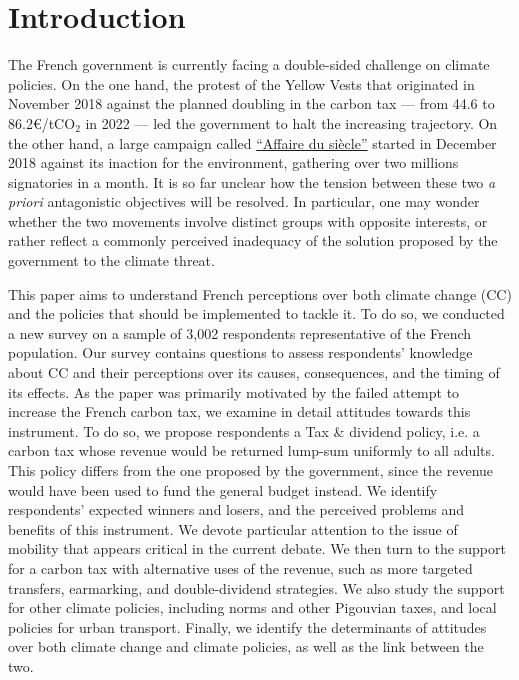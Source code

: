 \documentclass[english,5p,authoryear]{elsarticle}
\begin{document}




\setcounter{tocdepth}{2}

\vfill\eject 
\linenumbers

\section{Introduction}

The French government is currently facing a double-sided challenge on climate policies. On the one hand, the protest of the Yellow Vests that originated in November 2018 against the planned doubling in the carbon tax  --- from 44.6 to 86.2\euro{}/tCO$_2$ in 2022 --- led the government to halt the increasing trajectory. On the other hand, a large campaign called \href{https://laffairedusiecle.net/}{``Affaire du siècle''} started in December 2018 against its inaction for the environment, gathering over two millions signatories in a month. It is so far unclear how the tension between these two \textit{a priori} antagonistic objectives will be resolved. In particular, one may wonder whether the two movements involve distinct groups with opposite interests, or rather reflect a commonly perceived inadequacy of the solution proposed by the government to the climate threat.

This paper aims to understand French perceptions over both climate change (CC) and the policies that should be implemented to tackle it. To do so, we conducted a new survey on a sample of 3,002 respondents representative of the French population. Our survey contains questions to assess respondents' knowledge about CC and their perceptions over its causes, consequences, and the timing of its effects. As the paper was primarily motivated by the failed attempt to increase the French carbon tax, we examine in detail attitudes towards this instrument. To do so, we propose respondents a Tax \& dividend policy, i.e. a carbon tax whose revenue would be returned lump-sum uniformly to all adults. This policy differs from the one proposed by the government, since the revenue would have been used to fund the general budget instead. We identify respondents' expected winners and losers, and the perceived problems and benefits of this instrument. We devote particular attention to the issue of mobility that appears critical in the current debate. We then turn to the support for a carbon tax with alternative uses of the revenue, such as more targeted transfers, earmarking, and double-dividend strategies. We also study the support for other climate policies, including norms and other Pigouvian taxes, and local policies for urban transport. Finally, we identify the determinants of attitudes over both climate change and climate policies, as well as the link between the two.
\end{document}
